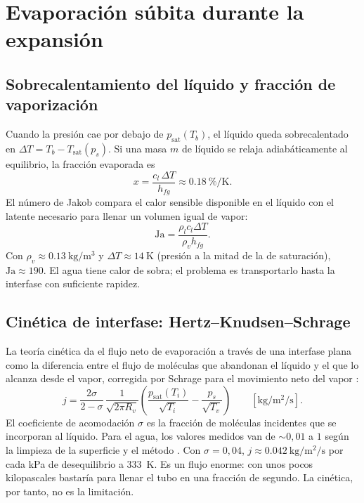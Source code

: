 \documentclass[11pt,a4paper]{article}
\newcommand{\psat}{p_{\mathrm{sat}}}
\newcommand{\Tsat}{T_{\mathrm{sat}}}
\newcommand{\hfg}{h_{fg}}
\begin{document}
\section{Evaporación súbita durante la expansión}

\subsection{Sobrecalentamiento del líquido y fracción de vaporización}

Cuando la presión cae por debajo de $\psat(T_b)$, el líquido queda sobrecalentado en $\Delta T = T_b - \Tsat(p_s)$. Si una masa $m$ de líquido se relaja adiabáticamente al equilibrio, la fracción evaporada es
\begin{equation}
x = \frac{c_l\,\Delta T}{\hfg} \approx \SI{0.18}{\percent\per\kelvin}.
\end{equation}
El número de Jakob compara el calor sensible disponible en el líquido con el latente necesario para llenar un volumen igual de vapor:
\begin{equation}
\mathrm{Ja} = \frac{\rho_l c_l \Delta T}{\rho_v \hfg}.
\end{equation}
Con $\rho_v\approx\SI{0.13}{\kilo\gram\per\cubic\metre}$ y $\Delta T\approx\SI{14}{\kelvin}$ (presión a la mitad de la de saturación), $\mathrm{Ja}\approx 190$. El agua tiene calor de sobra; el problema es transportarlo hasta la interfase con suficiente rapidez.

\subsection{Cinética de interfase: Hertz--Knudsen--Schrage}

La teoría cinética da el flujo neto de evaporación a través de una interfase plana como la diferencia entre el flujo de moléculas que abandonan el líquido y el que lo alcanza desde el vapor, corregida por Schrage para el movimiento neto del vapor \cite{schrage,carey}:
\begin{equation}
j = \frac{2\sigma}{2-\sigma}\,\frac{1}{\sqrt{2\pi R_v}}\left(\frac{\psat(T_i)}{\sqrt{T_i}} - \frac{p_s}{\sqrt{T_v}}\right)\qquad[\si{\kilo\gram\per\square\metre\per\second}].
\end{equation}
El coeficiente de acomodación $\sigma$ es la fracción de moléculas incidentes que se incorporan al líquido. Para el agua, los valores medidos van de $\sim0{,}01$ a $1$ según la limpieza de la superficie y el método \cite{marek}. Con $\sigma=0{,}04$, $j\approx\SI{0.042}{\kilo\gram\per\square\metre\per\second}$ por cada \si{\kilo\pascal} de desequilibrio a \SI{333}{\kelvin}. Es un flujo enorme: con unos pocos kilopascales bastaría para llenar el tubo en una fracción de segundo. La cinética, por tanto, no es la limitación.
\end{document}
